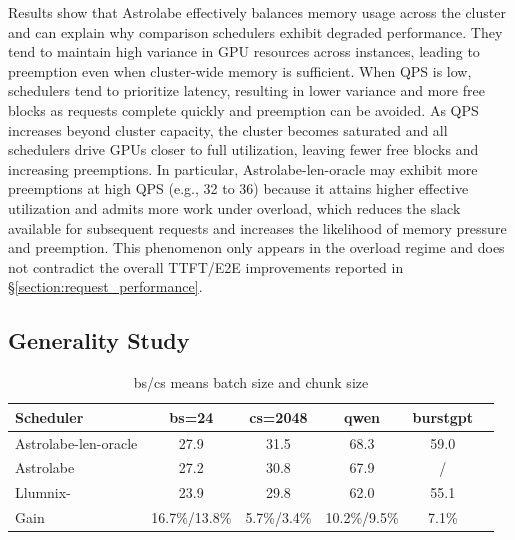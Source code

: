 \documentclass[sigconf, review, anonymous]{acmart}
\begin{document}
Results show that Astrolabe effectively balances memory usage across the cluster and can explain why comparison schedulers exhibit degraded performance. They tend to maintain high variance in GPU resources across instances, leading to preemption even when cluster-wide memory is sufficient. When QPS is low, schedulers tend to prioritize latency, resulting in lower variance and more free blocks as requests complete quickly and preemption can be avoided. As QPS increases beyond cluster capacity, the cluster becomes saturated and all schedulers drive GPUs closer to full utilization, leaving fewer free blocks and increasing preemptions. In particular, Astrolabe-len-oracle may exhibit more preemptions at high QPS (e.g., 32 to 36) because it attains higher effective utilization and admits more work under overload, which reduces the slack available for subsequent requests and increases the likelihood of memory pressure and preemption. This phenomenon only appears in the overload regime and does not contradict the overall TTFT/E2E improvements reported in \S\ref{section:request_performance}.



\subsection{Generality Study}\label{section:general_study}
\begin{table}[htb]
\caption{Scheduler Capacities with Setting Variables}
\small
\begin{tabular}{lccccl}
\toprule
Scheduler& bs=24 & cs=2048 & qwen & burstgpt \\
\midrule
Astrolabe-len-oracle & 27.9  & 31.5    & 68.3    & 59.0    \\
Astrolabe & 27.2  & 30.8    & 67.9    &  /   \\
Llumnix- & 23.9  & 29.8    & 62.0      & 55.1    \\
Gain  &  16.7\%/13.8\%  & 5.7\%/3.4\%    & 10.2\%/9.5\%      & 7.1\%    \\
\bottomrule
\end{tabular}
\caption*{bs/cs means batch size and chunk size}
\label{tab:scheduler_perf_scaled}
\end{table}
\end{document}
